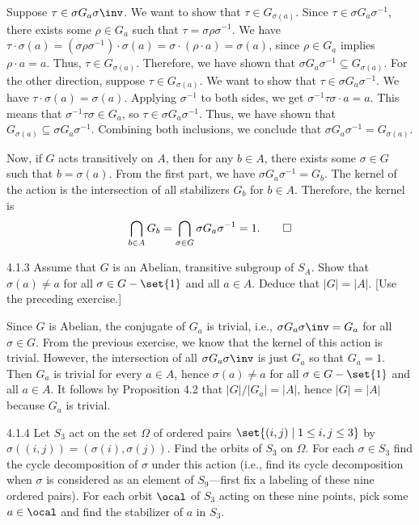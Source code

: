 \begin{sol}
	Suppose $\tau \in \sigma G_a\sigma\inv$.
	We want to show that $\tau \in G_{\sigma(a)}$.
	Since $\tau \in \sigma G_a \sigma^{-1}$, there exists some $\rho \in G_a$ such that $\tau = \sigma \rho \sigma^{-1}$.
	We have $\tau \cdot \sigma(a) = (\sigma \rho \sigma^{-1}) \cdot \sigma(a) = \sigma \cdot (\rho \cdot a) = \sigma(a)$, since $\rho \in G_a$ implies $\rho \cdot a = a$.
	Thus, $\tau \in G_{\sigma(a)}$.
	Therefore, we have shown that \(\sigma G_a \sigma^{-1} \subseteq G_{\sigma(a)}\).
	For the other direction, suppose $\tau \in G_{\sigma(a)}$.
	We want to show that $\tau \in \sigma G_a \sigma^{-1}$.
	We have $\tau \cdot \sigma(a) = \sigma(a)$.
	Applying $\sigma^{-1}$ to both sides, we get $\sigma^{-1} \tau \sigma \cdot a = a$.
	This means that $\sigma^{-1} \tau \sigma \in G_a$, so $\tau \in \sigma G_a \sigma^{-1}$.
	Thus, we have shown that \(G_{\sigma(a)} \subseteq \sigma G_a \sigma^{-1}\).
	Combining both inclusions, we conclude that \(\sigma G_a \sigma^{-1} = G_{\sigma(a)}\).

	Now, if $G$ acts transitively on $A$, then for any $b \in A$, there exists some $\sigma \in G$ such that $b = \sigma(a)$.
	From the first part, we have \(\sigma G_a \sigma^{-1} = G_b\).
	The kernel of the action is the intersection of all stabilizers \(G_b\) for \(b \in A\).
	Therefore, the kernel is
	\[
		\bigcap_{b \in A} G_b = \bigcap_{\sigma \in G} \sigma G_a \sigma^{-1} = 1. \qedhere
	\]
\end{sol}

\begin{exercise}{4.1.3}
	Assume that $G$ is an Abelian, transitive subgroup of $S_A$.
	Show that \(\sigma(a) \neq a\) for all \(\sigma \in G - \set{1}\) and all \(a \in A\).
	Deduce that \(|G| = |A|\). [Use the preceding exercise.]
\end{exercise}

\begin{sol}
	Since $G$ is Abelian, the conjugate of $G_a$ is trivial, i.e., $\sigma G_a \sigma\inv = G_a$ for all $\sigma \in G$.
	From the previous exercise, we know that the kernel of this action is trivial.
	However, the intersection of all $\sigma G_a\sigma\inv$ is just $G_a$ so that $G_a = 1$.
	Then $G_a$ is trivial for every $a \in A$, hence $\sigma(a) \neq a$ for all $\sigma \in G - \set{1}$ and all $a \in A$.
	It follows by Proposition 4.2 that $|G|/|G_a| = |A|$, hence $|G| = |A|$ because $G_a$ is trivial.
\end{sol}

\begin{exercise}{4.1.4}
	Let \(S_3\) act on the set \(\Omega\) of ordered pairs \(\set{(i,j) \mid 1 \le i,j \le 3}\) by \(\sigma((i,j)) = (\sigma(i), \sigma(j))\).
	Find the orbits of \(S_3\) on \(\Omega\).
	For each \(\sigma \in S_3\) find the cycle decomposition of \(\sigma\) under this action (i.e., find its cycle decomposition when \(\sigma\) is considered as an element of \(S_9\)—first fix a labeling of these nine ordered pairs).
	For each orbit \(\ocal\) of $S_3$ acting on these nine points, pick some \(a \in \ocal\) and find the stabilizer of \(a\) in \(S_3\).
\end{exercise}

